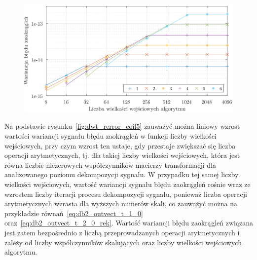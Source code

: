 \begin{figure}[htb!]
\begin{center}
\includegraphics{obrazki/dwt_rerror_coif5}
\end{center}
\end{figure}

Na podstawie rysunku~\ref{fig:dwt_rerror_coif5} zauważyć można liniowy wzrost wartości wariancji sygnału błędu zaokrągleń w funkcji liczby wielkości wejściowych, przy czym wzrost ten ustaje, gdy przestaje zwiększać się liczba operacji arytmetycznych, tj. dla takiej liczby wielkości wejściowych, która jest równa liczbie niezerowych współczynników macierzy transformacji dla analizowanego poziomu dekompozycji sygnału. W przypadku tej samej liczby wielkości wejściowych, wartość wariancji sygnału błędu zaokrągleń rośnie wraz ze wzrostem liczby iteracji procesu dekompozycji sygnału, ponieważ liczba operacji arytmetycznych wzrasta dla wyższych numerów skali, co zauważyć można na przykładzie równań~\eqref{eq:db2_outvect_t_1_0} oraz~\eqref{eq:db2_outvect_t_2_0_rek}. Wartość wariancji błędu zaokrągleń związana jest zatem bezpośrednio z liczbą przeprowadzanych operacji arytmetycznych i zależy od liczby współczynników skalujących oraz liczby wielkości wejściowych algorytmu.

